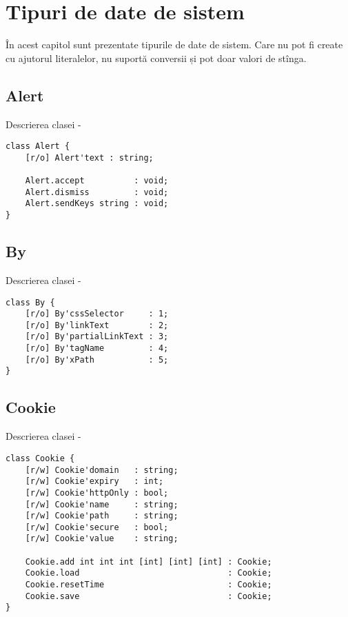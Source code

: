 \section{Tipuri de date de sistem}

În acest capitol sunt prezentate tipurile de date de sistem. Care nu pot fi create cu ajutorul literalelor, nu suportă conversii și pot doar valori de stînga.

\subsection{{\color{orange} Alert}}

\noindent Descrierea clasei  -
\begin{lstlisting}[numbers=none]
class Alert {
	[r/o] Alert'text : string;
	
	Alert.accept          : void;
	Alert.dismiss         : void;
	Alert.sendKeys string : void;
}
\end{lstlisting}

\subsection{{\color{orange} By}}

\noindent Descrierea clasei  -
\begin{lstlisting}[numbers=none]
class By {
	[r/o] By'cssSelector     : 1;
	[r/o] By'linkText        : 2;
	[r/o] By'partialLinkText : 3;
	[r/o] By'tagName         : 4;
	[r/o] By'xPath           : 5;
}
\end{lstlisting}

\subsection{{\color{orange} Cookie}}

\noindent Descrierea clasei  -
\begin{lstlisting}[numbers=none]
class Cookie {
	[r/w] Cookie'domain   : string;
	[r/w] Cookie'expiry   : int;
	[r/w] Cookie'httpOnly : bool;
	[r/w] Cookie'name     : string;
	[r/w] Cookie'path     : string;
	[r/w] Cookie'secure   : bool;
	[r/w] Cookie'value    : string;
	
	Cookie.add int int int [int] [int] [int] : Cookie;
	Cookie.load                              : Cookie;
	Cookie.resetTime                         : Cookie;
	Cookie.save                              : Cookie;
}
\end{lstlisting}

